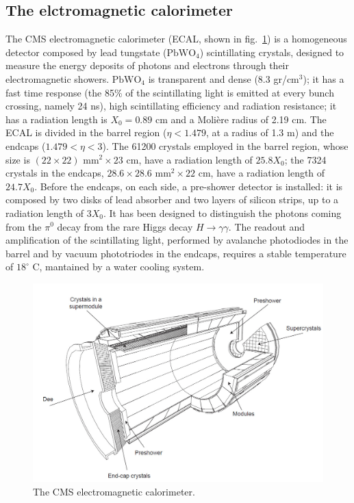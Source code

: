 \subsection{The elctromagnetic calorimeter}
The CMS electromagnetic calorimeter (ECAL, shown in fig.~\ref{fig:CMS_ecal}) is a homogeneous detector composed by lead tungstate ($\text{PbWO}_4$) scintillating crystals, designed to measure the energy deposits of photons and electrons through their electromagnetic showers. $\text{PbWO}_4$ is transparent and dense (8.3 gr/$\text{cm}^3$); it has a fast time response (the 85\% of the scintillating light is emitted at every bunch crossing, namely 24 ns), high scintillating efficiency and radiation resistance; it has a radiation length is $X_0 = 0.89$ cm and a Moli\`ere radius of 2.19 cm. The ECAL is divided in the barrel region ($\eta < 1.479$, at a radius of 1.3 m) and the endcaps ($1.479 < \eta < 3$).  The 61200 crystals employed in the barrel region, whose size is $(22 \times 22) \text{ mm}^2 \times 23 \text{ cm}$, have a radiation length of $25.8 X_0$; the 7324 crystals in the endcaps, $ 28.6 \times 28.6 \text{ mm}^2 \times 22 \text{ cm}$, have a radiation length of $24.7 X_0$. Before the endcaps, on each side, a pre-shower detector is installed: it is composed by two disks of lead absorber and two layers of silicon strips, up to a radiation length of $3X_0$. It has been designed to distinguish the photons coming from the $\pi^0$ decay from the rare Higgs decay $H \rightarrow \gamma \gamma$. The readout and amplification of the scintillating light, performed by avalanche photodiodes in the barrel and by vacuum phototriodes in the endcaps, requires a stable temperature of $18^{\circ}$ C, mantained by a water cooling system.

\begin{figure}[!htb]
  \centering
    \includegraphics[width=.7\textwidth]{figures/cmsecal.png}
  \caption{The CMS electromagnetic calorimeter.}
  \label{fig:CMS_ecal}
\end{figure}

